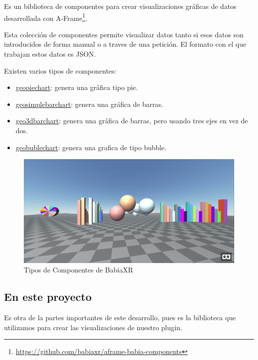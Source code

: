 \documentclass[a4paper, 12pt]{book}
\begin{document}
Es un biblioteca de componentes para crear visualizaciones gráficas de datos desarrollada con A-Frame\footnote{\url{https://github.com/babiaxr/aframe-babia-components}}. 

Esta colección de componentes permite visualizar datos tanto si esos datos son introducidos de forma manual o a traves de una petición. El formato con el que trabajan estos datos es JSON.

Existen varios tipos de componentes:
\begin{itemize}
    \item \underline{geopiechart}: genera una gráfica tipo pie.
    \item \underline{geosimplebarchart}: genera una gráfica de barras.
    \item \underline{geo3dbarchart}: genera una gráfica de barras, pero usando tres ejes en vez de dos.
    \item \underline{geobublechart}: genera una grafica de tipo bubble.
\end{itemize}

\begin{figure}[H]
  \centering
  \includegraphics[width=12cm, keepaspectratio]{img/development/babiaxrcomponents.png}
  \caption{Tipos de Componentes de BabiaXR}
  \label{fig:babiacomponents}
\end{figure}

\subsection{En este proyecto}

Es otra de la partes importantes de este desarrollo, pues es la biblioteca que utilizamos para crear las visualizaciones de nuestro plugin.


\end{document}
